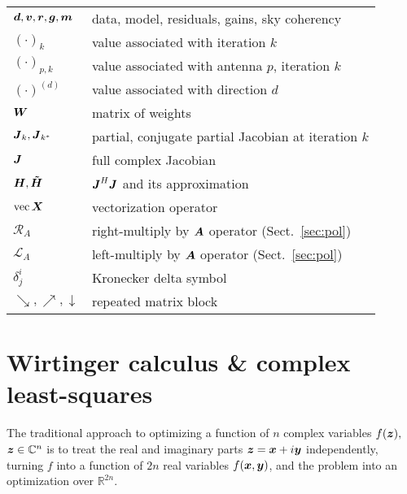 \documentclass[useAMS,usenatbib]{mn2e}
\newcommand{\COMPLEX}{\mathbb{C}}
\newcommand{\REAL}{\mathbb{R}}
\newcommand{\zz}{\bmath{z}}
\newcommand{\mat}[1]{{\bmath{#1}}}
\newcommand{\JJ}{\mat{J}} %
\newcommand{\JHJ}{\JJ^H\JJ} %
\newcommand{\Rop}[1]{\mathcal{R}_{{#1}}}
\newcommand{\Lop}[1]{\mathcal{L}_{{#1}}}
\numberwithin{equation}{section}
\begin{document}
\begin{table}
\begin{tabular}{ll}
$\bmath{d},\bmath{v},\bmath{r}, \bmath{g}, \bmath{m} $ & data, model, residuals, gains, sky coherency\\
$(\cdot)_k$ & value associated with iteration $k$ \\
$(\cdot)_{p,k}$ & value associated with antenna $p$, iteration $k$ \\
$(\cdot)^{(d)}$ & value associated with direction $d$\\
$\bmath{W}$ & matrix of weights \\
$\JJ_k, \JJ_{k^*}$ & partial, conjugate partial Jacobian at iteration $k$\\
$\JJ$ & full complex Jacobian \\
$\bmath{H}, \bmath{\tilde{H}}$ & $\JHJ$ and its approximation \\
$\mathrm{vec}\,\bmath{X}$ & vectorization operator \\
$\Rop{A}$ & right-multiply by $\bmath{A}$ operator (Sect.~\ref{sec:pol}) \\
$\Lop{A}$ & left-multiply by $\bmath{A}$ operator (Sect.~\ref{sec:pol}) \\
$\delta^i_j$ & Kronecker delta symbol \\
$\searrow,\nearrow,\downarrow$ & repeated matrix block \\
\hline



\end{tabular}
\end{table}

\section{Wirtinger calculus \& complex least-squares}
\label{sec:Wirtinger}

The traditional approach to optimizing a function of $n$ complex variables $f(\zz),$ $\zz\in\COMPLEX^n$ is
to treat the real and imaginary parts $\zz=\bmath{x}+i\bmath{y}$ independently, turning $f$ into a function
of $2n$ real variables $f(\bmath{x},\bmath{y})$, and the problem into an optimization over $\REAL^{2n}$.
\end{document}
